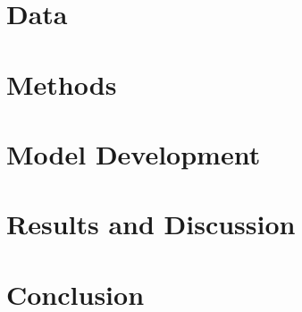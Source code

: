 \documentclass[a4paper,11pt]{report}
\begin{document}
\chapter{Data}
\label{chap:data}


\chapter{Methods}
\label{chap:methods}


\chapter{Model Development}
\label{chap:modelling}


\chapter{Results and Discussion}
\label{chap:results_discussion}


\chapter{Conclusion}
\label{chap:conclusion}






\appendix

\end{document}
